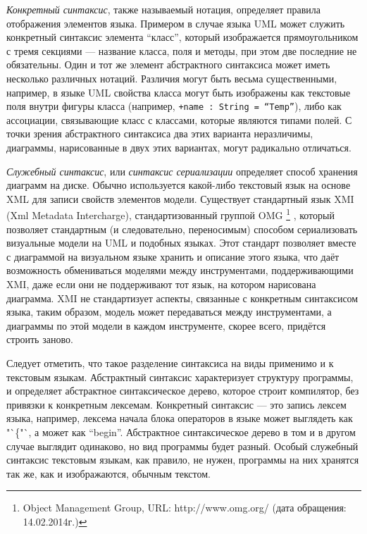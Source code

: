 \textit{Конкретный синтаксис}, также называемый нотация, определяет правила отображения 
элементов языка. Примером в случае языка UML может служить конкретный синтаксис 
элемента "`класс"', который изображается прямоугольником с тремя секциями --- 
название класса, поля и методы, при этом две последние не обязательны. Один и 
тот же элемент абстрактного синтаксиса может иметь несколько различных нотаций. 
Различия могут быть весьма существенными, например, в языке UML свойства класса 
могут быть изображены как текстовые поля внутри фигуры класса (например, 
\verb|+name : String = “Temp”|), либо как ассоциации, связывающие класс с 
классами, которые являются типами полей. С точки зрения абстрактного синтаксиса 
два этих варианта неразличимы, диаграммы, нарисованные в двух этих вариантах, 
могут радикально отличаться.

\textit{Служебный синтаксис}, или \textit{синтаксис сериализации} определяет способ хранения 
диаграмм на диске. Обычно используется какой-либо текстовый язык на основе XML 
для записи свойств элементов модели. Существует стандартный язык XMI 
(Xml Metadata Intercharge), стандартизованный группой OMG
\footnote{Object Management Group, URL: http://www.omg.org/ (дата обращения: 14.02.2014г.)}
, который позволяет стандартным (и следовательно, переносимым) способом сериализовать визуальные 
модели на UML и подобных языках. Этот стандарт позволяет вместе с диаграммой 
на визуальном языке хранить и описание этого языка, что даёт возможность 
обмениваться моделями между инструментами, поддерживающими XMI, даже если они 
не поддерживают тот язык, на котором нарисована диаграмма. 
XMI не стандартизует 
аспекты, связанные с конкретным синтаксисом языка, таким образом, модель может 
передаваться между инструментами, а диаграммы по этой модели в каждом 
инструменте, скорее всего, придётся строить заново.

Следует отметить, что такое разделение синтаксиса на виды применимо и к 
текстовым языкам. Абстрактный синтаксис характеризует структуру программы, и 
определяет абстрактное синтаксическое дерево, которое строит компилятор, 
без привязки к конкретным лексемам. Конкретный синтаксис --- это запись лексем 
языка, например, лексема начала блока операторов в языке может выглядеть как 
"`\{"`, а может как "`begin"'. Абстрактное синтаксическое дерево в том и в 
другом случае выглядит одинаково, но вид программы будет разный. Особый 
служебный синтаксис текстовым языкам, как правило, не нужен, программы на них 
хранятся так же, как и изображаются, обычным текстом.

